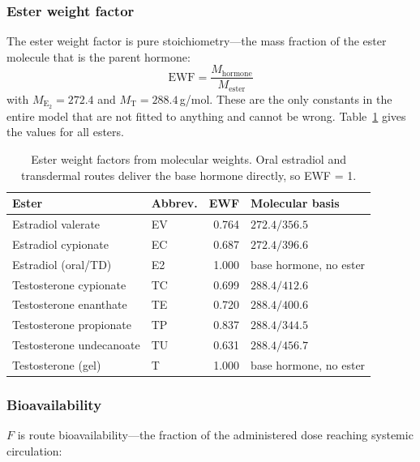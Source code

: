 \documentclass[11pt,a4paper]{article}
\begin{document}
\subsubsection{Ester weight factor}

The ester weight factor is pure stoichiometry---the mass fraction of the
ester molecule that is the parent hormone:
\[
\mathrm{EWF} = \frac{M_{\text{hormone}}}{M_{\text{ester}}}
\]
with $M_{\mathrm{E}_2} = 272.4$ and $M_{\mathrm{T}} = 288.4$\,g/mol.
These are the only constants in the entire model that are not fitted to
anything and cannot be wrong. Table~\ref{tab:ewf} gives the values for
all esters.

\begin{table}[h]
\centering
\small
\begin{tabular}{@{}llrl@{}}
\toprule
\textbf{Ester} & \textbf{Abbrev.} & \textbf{EWF} & \textbf{Molecular basis} \\
\midrule
Estradiol valerate    & EV       & 0.764 & $272.4 / 356.5$ \\
Estradiol cypionate   & EC       & 0.687 & $272.4 / 396.6$ \\
Estradiol (oral/TD)   & E2       & 1.000 & base hormone, no ester \\
Testosterone cypionate & TC      & 0.699 & $288.4 / 412.6$ \\
Testosterone enanthate & TE      & 0.720 & $288.4 / 400.6$ \\
Testosterone propionate & TP     & 0.837 & $288.4 / 344.5$ \\
Testosterone undecanoate & TU    & 0.631 & $288.4 / 456.7$ \\
Testosterone (gel)    & T        & 1.000 & base hormone, no ester \\
\bottomrule
\end{tabular}
\caption{Ester weight factors from molecular weights. Oral estradiol
and transdermal routes deliver the base hormone directly, so EWF = 1.}
\label{tab:ewf}
\end{table}

\subsubsection{Bioavailability}

$F$ is route bioavailability---the fraction of the administered dose
reaching systemic circulation:
\end{document}
